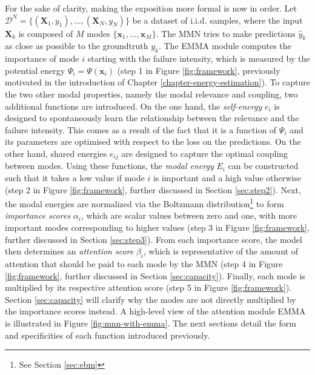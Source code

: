 For the sake of clarity, making the exposition more formal is now in order. Let $\mathcal{D}^{N} = \{(\mathbf{X}_1,  y_1), \ldots, (\mathbf{X}_N, y_N)\}$ be a dataset of i.i.d. samples, where the input $\textbf{X}_k$ is composed of $M$ modes $\{\mathbf{x}_1, \ldots, \mathbf{x}_M\}$. The MMN tries to make predictions $\hat{y}_k$ as close as possible to the groundtruth $y_k$. The EMMA module computes the importance of mode $i$ starting with the failure intensity, which is measured by the potential energy $\Psi_i = \Psi(\mathbf{x}_i)$ (step 1 in Figure \ref{fig:framework}, previously motivated in the introduction of Chapter \ref{chapter-energy-estimation}). To capture the two other modal properties, namely the modal relevance and coupling, two additional functions are introduced. On the one hand, the \textit{self-energy} $e_i$ is designed to spontaneously learn the relationship between the relevance and the failure intensity. This comes as a result of the fact that it is a function of $\Psi_i$ and its parameters are optimised with respect to the loss on the predictions. On the other hand, shared energies $e_{ij}$ are designed to capture the optimal coupling between modes. Using these functions, the \textit{modal energy} $E_i$ can be constructed such that it takes a low value if mode $i$ is important and a high value otherwise (step 2 in Figure \ref{fig:framework}, further discussed in Section \ref{sec:step2}). Next, the modal energies are normalized via the Boltzmann distribution\footnote{See Section \ref{sec:ebm}} to form \textit{importance scores} $\alpha_i$, which are scalar values between zero and one, with more important modes corresponding to higher values (step 3 in Figure \ref{fig:framework}, further discussed in Section \ref{sec:step3}). From each importance score, the model then determines an \textit{attention score} $\beta_i$, which is representative of the amount of attention that should be paid to each mode by the MMN (step 4 in Figure \ref{fig:framework}, further discussed in Section \ref{sec:capacity}). Finally, each mode is multiplied by its respective attention score (step 5 in Figure \ref{fig:framework}). Section \ref{sec:capacity} will clarify why the modes are not directly multiplied by the importance scores instead.  A high-level view of the attention module EMMA is illustrated in Figure \ref{fig:mnn-with-emma}. The next sections detail the form and specificities of each function introduced previously.

